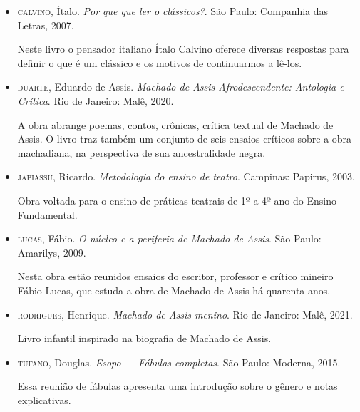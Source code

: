 \documentclass[11pt]{extarticle}
\begin{document}
\begin{itemize}

\item \textsc{calvino}, Ítalo. \textit{Por que que ler o clássicos?}. São Paulo: Companhia das Letras, 2007.

Neste livro o pensador italiano Ítalo Calvino oferece diversas respostas para definir o que é um clássico e os motivos de continuarmos a lê-los.

\item \textsc{duarte}, Eduardo de Assis. \textit{Machado de Assis Afrodescendente: Antologia e Crítica}. Rio de Janeiro: Malê, 2020.

A obra abrange poemas, contos, crônicas, crítica textual de Machado de Assis. O livro traz também um conjunto de seis ensaios críticos sobre a obra machadiana, na perspectiva de sua ancestralidade negra.

\item \textsc{japiassu}, Ricardo. \textit{Metodologia do ensino de teatro}. Campinas: Papirus, 2003.

Obra voltada para o ensino de práticas teatrais de 1º a 4º ano do Ensino Fundamental.

\item \textsc{lucas}, Fábio. \textit{O núcleo e a periferia de Machado de Assis}. São Paulo: Amarilys, 2009.

Nesta obra estão reunidos ensaios do escritor, professor e crítico mineiro Fábio Lucas, que estuda a obra de Machado de Assis há quarenta anos.

\item \textsc{rodrigues}, Henrique. \textit{Machado de Assis menino}. Rio de Janeiro: Malê, 2021.

Livro infantil inspirado na biografia de Machado de Assis.

\item \textsc{tufano}, Douglas. \textit{Esopo --- Fábulas completas}. São Paulo: Moderna, 2015.
 
Essa reunião de fábulas apresenta uma introdução sobre o gênero e notas explicativas.

\end{itemize}
\end{document}
